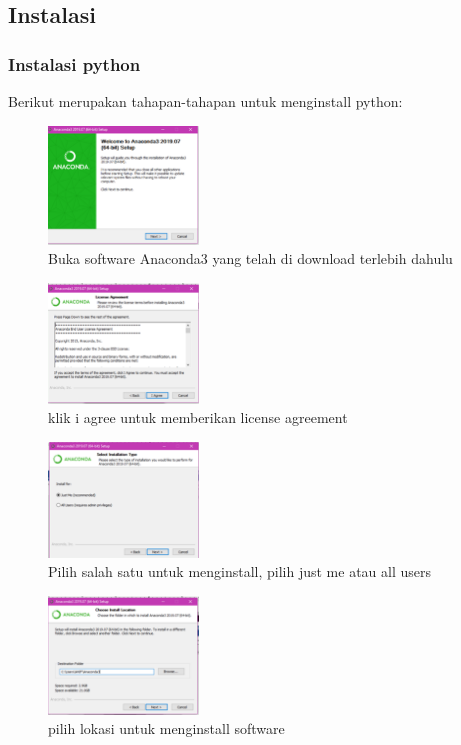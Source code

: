\subsection{Instalasi}
\subsubsection{Instalasi python}
Berikut merupakan tahapan-tahapan untuk menginstall python:
	\begin{figure}[H]
		\includegraphics[width=4cm]{figures/1184065/4.PNG}
		\centering
		\caption{Buka software Anaconda3 yang telah di download terlebih dahulu}
	\end{figure}
	\begin{figure}[H]
		\includegraphics[width=4cm]{figures/1184065/5.PNG}
		\centering
		\caption{klik i agree untuk memberikan license agreement}
	\end{figure}
	\begin{figure}[H]
		\includegraphics[width=4cm]{figures/1184065/6.PNG}
		\centering
		\caption{Pilih salah satu untuk menginstall, pilih just me atau all users}
	\end{figure}
	\begin{figure}[H]
		\includegraphics[width=4cm]{figures/1184065/7.PNG}
		\centering
		\caption{pilih lokasi untuk menginstall software }
	\end{figure}
